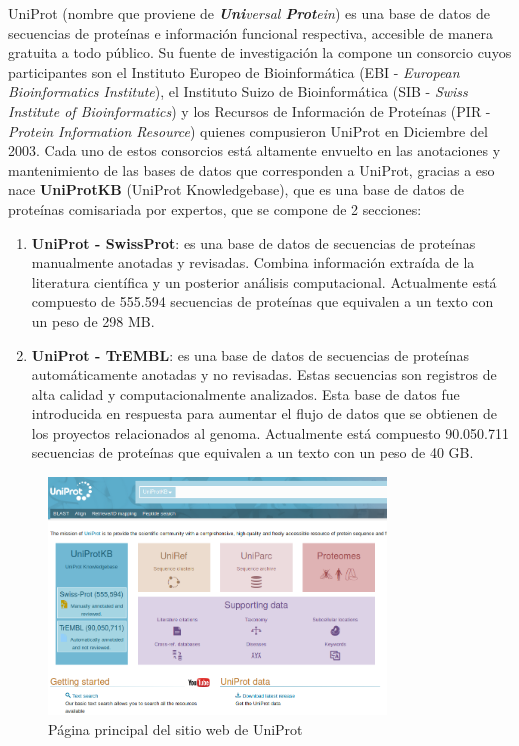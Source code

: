 UniProt (nombre que proviene de \textit{\textbf{Uni}versal \textbf{Prot}ein}) es una base de datos de secuencias de proteínas e información funcional respectiva, accesible de manera gratuita a todo público. Su fuente de investigación la compone un consorcio cuyos participantes son el Instituto Europeo de Bioinformática (EBI - \textit{European Bioinformatics Institute}), el Instituto Suizo de Bioinformática (SIB - \textit{Swiss Institute of Bioinformatics}) y los Recursos de Información de Proteínas (PIR - \textit{Protein Information Resource}) quienes compusieron UniProt en Diciembre del 2003. Cada uno de estos consorcios está altamente envuelto en las anotaciones y mantenimiento de las bases de datos que corresponden a UniProt, gracias a eso nace \textbf{UniProtKB} (UniProt Knowledgebase), que es una base de datos de proteínas comisariada por expertos, que se compone de 2 secciones:


\begin{enumerate}

\item \textbf{UniProt - SwissProt}: es una base de datos de secuencias de proteínas manualmente anotadas y revisadas. Combina información extraída de la literatura científica y un posterior análisis computacional. Actualmente está compuesto de 555.594 secuencias de proteínas que equivalen a un texto con un peso de 298 MB.

\item \textbf{UniProt - TrEMBL}: es una base de datos de secuencias de proteínas automáticamente anotadas y no revisadas. Estas secuencias son registros de alta calidad y computacionalmente analizados. Esta base de datos fue introducida en respuesta para aumentar el flujo de datos que se obtienen de los proyectos relacionados al genoma. Actualmente está compuesto 90.050.711 secuencias de proteínas que equivalen a un texto con un peso de 40 GB.

\end{enumerate}

\begin{figure}[!htb]
    \centering
    \includegraphics[width=0.8\textwidth]{./images/uniprot_main.png}
    \caption{Página principal del sitio web de UniProt}
    \label{fig:image7}
\end{figure}

